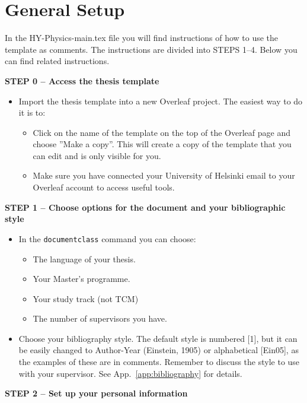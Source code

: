 

\section{General Setup}

In the HY-Physics-main.tex file you will find instructions of how to use the template as comments. The instructions are divided into STEPS 1--4. Below you can find related instructions.
\vspace{0.5cm}

\textbf{STEP 0 -- Access the thesis template}

\begin{itemize}
\item Import the thesis template into a new Overleaf project. The easiest way to do it is to:
\begin{itemize}
    \item Click on the name of the template on the top of the Overleaf page and choose ''Make a copy''. This will create a copy of the template that you can edit and is only visible for you.
    \item Make sure you have connected your University of Helsinki email to your Overleaf account to access useful tools.
\end{itemize}
\end{itemize}

\textbf{STEP 1 -- Choose options for the document and your bibliographic style}
\begin{itemize}
    \item In the \texttt{documentclass} command you can choose:
    \begin{itemize}
        \item The language of your thesis.
        \item Your Master's programme.
        \item Your study track (not TCM)
        \item The number of supervisors you have.
    \end{itemize}
    \item Choose your bibliography style. The default style is numbered [1], but it can be easily changed to Author-Year (Einstein, 1905) or alphabetical [Ein05], as the examples of these are in comments. Remember to discuss the style to use with your supervisor. See App.~\ref{app:bibliography} for details.
\end{itemize}


{\textbf{STEP 2 -- Set up your personal information}}

